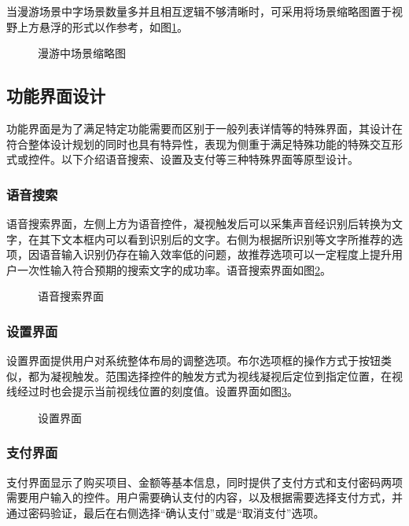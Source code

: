 当漫游场景中字场景数量多并且相互逻辑不够清晰时，可采用将场景缩略图置于视野上方悬浮的形式以作参考，如图\ref{fig:d-11}。

\begin{figure}[htp]
\centering
{}
\caption{漫游中场景缩略图}
\label{fig:d-11}
\end{figure}

\subsection{功能界面设计}

功能界面是为了满足特定功能需要而区别于一般列表详情等的特殊界面，其设计在符合整体设计规划的同时也具有特异性，表现为侧重于满足特殊功能的特殊交互形式或控件。以下介绍语音搜索、设置及支付等三种特殊界面等原型设计。

\subsubsection{语音搜索}
语音搜索界面，左侧上方为语音控件，凝视触发后可以采集声音经识别后转换为文字，在其下文本框内可以看到识别后的文字。右侧为根据所识别等文字所推荐的选项，因语音输入识别仍存在输入效率低的问题，故推荐选项可以一定程度上提升用户一次性输入符合预期的搜索文字的成功率。语音搜索界面如图\ref{fig:d-04}。

\begin{figure}[htp]
\centering
{}
\caption{语音搜索界面}
\label{fig:d-04}
\end{figure}

\subsubsection{设置界面}
设置界面提供用户对系统整体布局的调整选项。布尔选项框的操作方式于按钮类似，都为凝视触发。范围选择控件的触发方式为视线凝视后定位到指定位置，在视线经过时也会提示当前视线位置的刻度值。设置界面如图\ref{fig:d-05}。

\begin{figure}[htp]
\centering
{}
\caption{设置界面}
\label{fig:d-05}
\end{figure}

\subsubsection{支付界面}
支付界面显示了购买项目、金额等基本信息，同时提供了支付方式和支付密码两项需要用户输入的控件。用户需要确认支付的内容，以及根据需要选择支付方式，并通过密码验证，最后在右侧选择“确认支付”或是“取消支付”选项。

